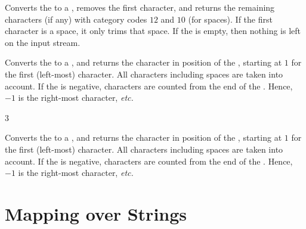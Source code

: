 \documentclass[oneside]{book}
\begin{document}
\begin{function}{\StrVarTail}
\begin{syntax}
 
\end{syntax}
Converts the  to a , removes the first
character, and returns the remaining characters (if any)
with category codes $12$ and $10$ (for spaces).
If the first character is a space, it only trims that space.
If the  is empty,
then nothing is left on the input stream.
\begin{demohigh}
\StrSet {}
\StrVarTail \lTmpaStr
\end{demohigh}
\end{function}

\begin{function}{\StrItem}
\begin{syntax}
  
\end{syntax}
Converts the  to a ,
and returns the character in position  of
the , starting at $1$ for the first (left-most)
character. All characters including spaces are taken into account.
If the  is negative,
characters are counted from the end of the . Hence,
$-1$ is the right-most character, \emph{etc.}
\begin{demohigh}
 {3}
\end{demohigh}
\end{function}

\begin{function}{\StrVarItem}
\begin{syntax}
  
\end{syntax}
Converts the  to a ,
and returns the character in position  of
the , starting at $1$ for the first (left-most)
character. All characters including spaces are taken into account.
If the  is negative,
characters are counted from the end of the . Hence,
$-1$ is the right-most character, \emph{etc.}
\begin{demohigh}
\StrSet {}
\StrVarItem {}
\end{demohigh}
\end{function}

\section{Mapping over Strings}
\end{document}
